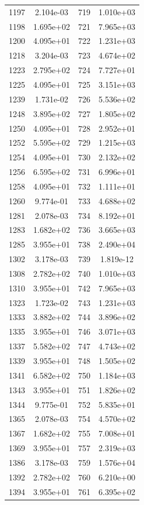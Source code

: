 \documentclass[12pt]{article}
\begin{document}
\begin{longtable}{@{}cccc@{}}
1197 & 2.104e-03 & 719 & 1.010e+03 \\
1198 & 1.695e+02 & 721 & 7.965e+03 \\
1200 & 4.095e+01 & 722 & 1.231e+03 \\
1218 & 3.204e-03 & 723 & 4.674e+02 \\
1223 & 2.795e+02 & 724 & 7.727e+01 \\
1225 & 4.095e+01 & 725 & 3.151e+03 \\
1239 & 1.731e-02 & 726 & 5.536e+02 \\
1248 & 3.895e+02 & 727 & 1.805e+02 \\
1250 & 4.095e+01 & 728 & 2.952e+01 \\
1252 & 5.595e+02 & 729 & 1.215e+03 \\
1254 & 4.095e+01 & 730 & 2.132e+02 \\
1256 & 6.595e+02 & 731 & 6.996e+01 \\
1258 & 4.095e+01 & 732 & 1.111e+01 \\
1260 & 9.774e-01 & 733 & 4.688e+02 \\
1281 & 2.078e-03 & 734 & 8.192e+01 \\
1283 & 1.682e+02 & 736 & 3.665e+03 \\
1285 & 3.955e+01 & 738 & 2.490e+04 \\
1302 & 3.178e-03 & 739 & 1.819e-12 \\
1308 & 2.782e+02 & 740 & 1.010e+03 \\
1310 & 3.955e+01 & 742 & 7.965e+03 \\
1323 & 1.723e-02 & 743 & 1.231e+03 \\
1333 & 3.882e+02 & 744 & 3.896e+02 \\
1335 & 3.955e+01 & 746 & 3.071e+03 \\
1337 & 5.582e+02 & 747 & 4.743e+02 \\
1339 & 3.955e+01 & 748 & 1.505e+02 \\
1341 & 6.582e+02 & 750 & 1.184e+03 \\
1343 & 3.955e+01 & 751 & 1.826e+02 \\
1344 & 9.775e-01 & 752 & 5.835e+01 \\
1365 & 2.078e-03 & 754 & 4.570e+02 \\
1367 & 1.682e+02 & 755 & 7.008e+01 \\
1369 & 3.955e+01 & 757 & 2.319e+03 \\
1386 & 3.178e-03 & 759 & 1.576e+04 \\
1392 & 2.782e+02 & 760 & 6.210e+00 \\
1394 & 3.955e+01 & 761 & 6.395e+02 \\

\end{longtable}
\end{document}
